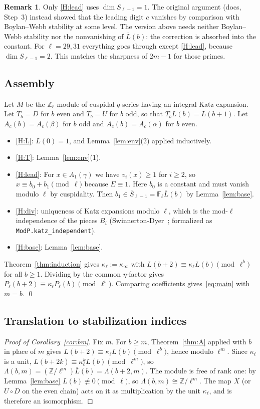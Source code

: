 \documentclass[11pt]{amsart}
\newcommand{\Z}{\mathbb{Z}}
\newcommand{\Zl}{\mathbb{Z}_\ell}
\newcommand{\Fl}{\mathbb{F}_\ell}
\newcommand{\Sb}{\overline{S}}
\newcommand{\Lb}{\overline{L}}
\newcommand{\lean}[1]{\texttt{#1}}
\theoremstyle{plain}
\theoremstyle{definition}
\newtheorem{remark}[theorem]{Remark}
\numberwithin{equation}{section}
\begin{document}
\begin{remark}
Only \ref{H:lead} uses $\dim S_{\ell-1}=1$. The original argument (docs, Step~3) instead showed that the leading digit
$c$ vanishes by comparison with Boylan--Webb stability at some level. The version above needs neither Boylan--Webb
stability nor the nonvanishing of $\Lb(b)$: the correction is absorbed into the constant. For $\ell=29,31$ everything
goes through except \ref{H:lead}, because $\dim S_{\ell-1}=2$. This matches the sharpness of $2m-1$ for those primes.
\end{remark}

\subsection{Assembly}\label{sec:assembly}
Let $M$ be the $\Zl$-module of cuspidal $q$-series having an integral Katz expansion. Let $T_b=D$ for $b$ even and
$T_b=U$ for $b$ odd, so that $T_bL(b)=L(b+1)$. Let $A_c(b)=A_c(\beta)$ for $b$ odd and $A_c(b)=A_c(\alpha)$ for $b$ even.
\begin{itemize}
\item \ref{H:L}: $L(0)=1$, and Lemma~\ref{lem:env}(2) applied inductively.
\item \ref{H:T}: Lemma~\ref{lem:env}(1).
\item \ref{H:lead}: For $x\in A_1(\gamma)$ we have $v_i(x)\ge1$ for $i\ge2$, so $x\equiv b_0+b_1\pmod\ell$ because $E\equiv1$. Here
  $b_0$ is a constant and must vanish modulo $\ell$ by cuspidality. Then $b_1\in\Sb_{\ell-1}=\Fl\Lb(b)$ by Lemma~\ref{lem:base}.
\item \ref{H:div}: uniqueness of Katz expansions modulo $\ell$, which is the mod-$\ell$ independence of the pieces
  $B_i$ (Swinnerton-Dyer~\cite{SwinnertonDyer1973}; formalized as \lean{ModP.katz\_independent}).
\item \ref{H:base}: Lemma~\ref{lem:base}.
\end{itemize}
Theorem~\ref{thm:induction} gives $\kappa_\ell:=\kappa_\infty$ with $L(b+2)\equiv\kappa_\ell L(b)\pmod{\ell^b}$ for all
$b\ge1$. Dividing by the common $\eta$-factor gives $P_\ell(b+2)\equiv\kappa_\ell P_\ell(b)\pmod{\ell^b}$. Comparing
coefficients gives~\eqref{eq:main} with $m=b$. \qed

\subsection{Translation to stabilization indices}\label{sec:translation}
\begin{proof}[Proof of Corollary~\ref{cor:bm}]
Fix $m$. For $b\ge m$, Theorem~\ref{thm:A} applied with $b$ in place of $m$ gives $L(b+2)\equiv\kappa_\ell L(b)\pmod{\ell^b}$,
hence modulo $\ell^m$. Since $\kappa_\ell$ is a unit, $L(b+2k)\equiv\kappa_\ell^kL(b)\pmod{\ell^m}$, so
$\Lambda(b,m)=(\Z/\ell^m)\Lb(b)=\Lambda(b+2,m)$. The module is free of rank one: by Lemma~\ref{lem:base} $L(b)\not\equiv0\pmod\ell$,
so $\Lambda(b,m)\cong\Z/\ell^m$. The map $X$ (or $U\circ D$ on the even chain) acts on it as multiplication by the unit
$\kappa_\ell$, and is therefore an isomorphism.
\end{proof}
\end{document}
